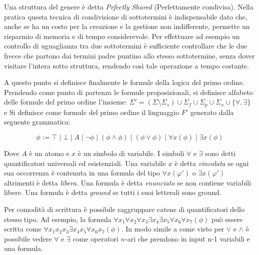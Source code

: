 \documentclass[./main.tex]{subfiles}
\begin{document}
Una struttura del genere è detta \textit{Prfectly Shared} (Perfettamente condivisa). Nella pratica questa
tecnica di condivisione di sottotermini è indispensabile dato che,
anche se ha un costo per la creazione e la gestione non indifferente,
permette un risparmio di memoria e di tempo considerevole. Per effettuare ad esempio un controllo 
di uguaglianza tra due sottotermini è sufficiente controllare che le due frecce che partono dai termini padre
puntino allo stesso sottotermine, senza dover visitare l'intera sotto struttura, rendendo così tale operazione a tempo costante.


A questo punto si definisce finalmente le formule della logica del primo ordine. Prendendo come punto di partenza le formule proposizionali,
si definisce alfabeto delle formule del primo ordine l'insieme: 
$\Sigma' = (\Sigma \setminus \Sigma_s) \cup \Sigma_f \cup \Sigma_p \cup \Sigma_x \cup \{\forall, \exists\}$ 
e Si definisce come formule del primo ordine il linguaggio $F'$ generato dalla seguente grammatica:

$$ \phi := \top \mid \bot \mid A \mid \lnot \phi \mid (\phi \land \phi) \mid (\phi \lor \phi) \mid \forall x (\phi) \mid \exists x (\phi) $$

Dove $A$ è un atomo e $x$ è un simbolo di variabile. I simboli $\forall$ e $\exists$ sono detti quantificatori universali ed esistenziali.
Una variabile $x$ è detta \textit{vincolata} se ogni sua occorrenza è contenuta in una formula del tipo $\forall x (\varphi')$ o $\exists x (\varphi')$ 
altrimenti è detta \textit{libera}. Una formula è detta \textit{enunciato} se non contiene variabili libere. Una formula è detta 
\textit{ground} se tutti i suoi letterali sono ground.

Per comodità di scrittura è possibile raggruppare catene di quantificatori dello stesso tipo. Ad esempio, la formula 
$ \forall x_1 \forall x_2 \forall x_3 \exists x_4 \exists x_5 \forall x_6 \forall x_7 (\phi)$ può essere scritta come 
$\forall x_1 x_2 x_3 \exists x_4 x_5 \forall x_6 x_7 (\phi)$. In modo simile a come visto per $\lor$ e $\land$ è possibile vedere
$\forall$ e $\exists$ come operatori $n$-ari che prendono in input n-1 variabili e una formula.



\end{document}
